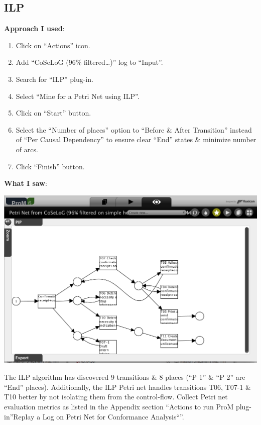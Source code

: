 \documentclass[]{article}
\begin{document}
\subsection{ILP}\label{ilp}

\textbf{Approach I used}:

\begin{enumerate}
\def\labelenumi{\arabic{enumi}.}
\itemsep1pt\parskip0pt
\item
  Click on ``Actions'' icon.
\item
  Add ``CoSeLoG (96\% filtered\ldots{})'' log to ``Input''.\\
\item
  Search for ``ILP'' plug-in.
\item
  Select ``Mine for a Petri Net using ILP''.
\item
  Click on ``Start'' button.
\item
  Select the ``Number of places'' option to ``Before \& After
  Transition'' instead of ``Per Causal Dependency'' to ensure clear
  ``End'' states \& minimize number of arcs.
\item
  Click ``Finish'' button.
\end{enumerate}

\textbf{What I saw}:

\includegraphics{CoSeLoG_Step_05_Filter96_PetriNet_ILP.png}

The ILP algorithm has discovered 9 transitions \& 8 places (``P 1'' \&
``P 2'' are ``End'' places). Additionally, the ILP Petri net handles
transitions T06, T07-1 \& T10 better by not isolating them from the
control-flow. Collect Petri net evaluation metrics as listed in the
Appendix section ``Actions to run ProM plug-in''Replay a Log on Petri
Net for Conformance Analysis``''.
\end{document}
